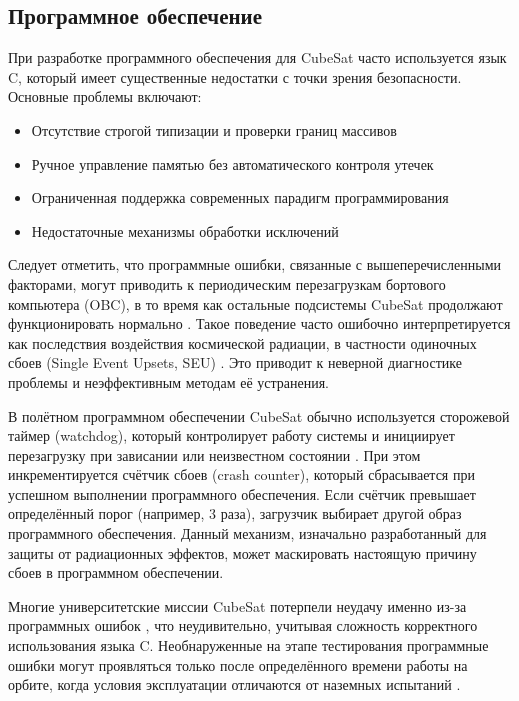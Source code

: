 \subsection{Программное обеспечение}
При разработке программного обеспечения для CubeSat часто используется язык C, который имеет существенные недостатки с точки зрения безопасности. Основные проблемы включают:

\begin{itemize}
	\item Отсутствие строгой типизации и проверки границ массивов
	\item Ручное управление памятью без автоматического контроля утечек
	\item Ограниченная поддержка современных парадигм программирования
	\item Недостаточные механизмы обработки исключений
\end{itemize}

Следует отметить, что программные ошибки, связанные с вышеперечисленными факторами, могут приводить к периодическим перезагрузкам бортового компьютера (OBC), в то время как остальные подсистемы CubeSat продолжают функционировать нормально \cite{langer2009reliability}. Такое поведение часто ошибочно интерпретируется как последствия воздействия космической радиации, в частности одиночных сбоев (Single Event Upsets, SEU) \cite{koopman2020edge}. Это приводит к неверной диагностике проблемы и неэффективным методам её устранения.

В полётном программном обеспечении CubeSat обычно используется сторожевой таймер (watchdog), который контролирует работу системы и инициирует перезагрузку при зависании или неизвестном состоянии \cite{kastensmidt2019fault}. При этом инкрементируется счётчик сбоев (crash counter), который сбрасывается при успешном выполнении программного обеспечения. Если счётчик превышает определённый порог (например, 3 раза), загрузчик выбирает другой образ программного обеспечения. Данный механизм, изначально разработанный для защиты от радиационных эффектов, может маскировать настоящую причину сбоев в программном обеспечении.

Многие университетские миссии CubeSat потерпели неудачу именно из-за программных ошибок \cite{guo2014flight}, что неудивительно, учитывая сложность корректного использования языка C. Необнаруженные на этапе тестирования программные ошибки могут проявляться только после определённого времени работы на орбите, когда условия эксплуатации отличаются от наземных испытаний \cite{dubey2009evaluating}.

